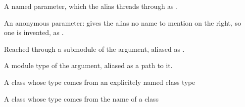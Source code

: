 \begin{ocamlindent}
\medbreak
\label{Oxcaml-Include_functor_argument_shapes--type-applied}\begin{ocamlindent}A named parameter, which the alias threads through as .\end{ocamlindent}%
\medbreak
\label{Oxcaml-Include_functor_argument_shapes--type-anonymous}\begin{ocamlindent}An anonymous parameter: \ocamlinlinecode{\_\allowbreak{}} gives the alias no name to mention on the right, so one is invented, as .\end{ocamlindent}%
\medbreak
\label{Oxcaml-Include_functor_argument_shapes--type-from_module}\begin{ocamlindent}Reached through a submodule of the argument, aliased as .\end{ocamlindent}%
\medbreak
\label{Oxcaml-Include_functor_argument_shapes--module-type-Reexported}\begin{ocamlindent}A module type of the argument, aliased as a path to it.\end{ocamlindent}%
\medbreak
\label{Oxcaml-Include_functor_argument_shapes--class-output_class_via_type}\begin{ocamlindent}A class whose type comes from an explicitely named class type\end{ocamlindent}%
\medbreak
\label{Oxcaml-Include_functor_argument_shapes--class-output_class_via_name}\begin{ocamlindent}A class whose type comes from the name of a class\end{ocamlindent}%

\end{ocamlindent}
